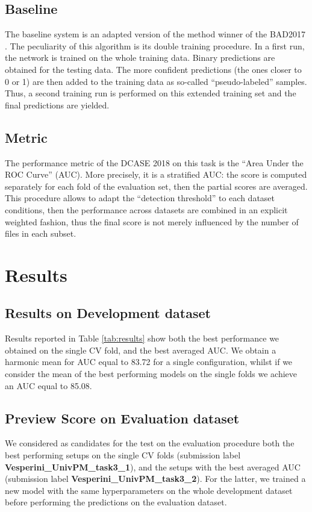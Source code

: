 \subsection{Baseline}
The baseline system is an adapted version of the method winner of the BAD2017 \cite{grill2017two}. The peculiarity of this algorithm is its double training procedure. In a first run, the network is trained on the whole training data. Binary predictions are obtained for the testing data. The more confident predictions (the ones closer to 0 or 1) are then added to the training data as so-called ``pseudo-labeled'' samples. Thus, a second training run is performed on this extended training set and the final predictions are yielded.



\subsection{Metric}
The performance metric of the DCASE 2018 on this task is the ``Area Under the ROC Curve'' (AUC). More precisely, it is a stratified AUC: the score is computed separately for each fold of the evaluation set, then the partial scores are averaged. This procedure allows to adapt the ``detection threshold'' to each dataset conditions, then the performance across datasets are combined in an explicit weighted fashion, thus the final score is not merely influenced by the number of files in each subset.


\section{Results}
\label{sec:results}
\subsection{Results on Development dataset}
Results reported in Table \ref{tab:results} show both the best performance we obtained on the single CV fold, and the best averaged AUC. We obtain a harmonic mean for AUC equal to 83.72 for a single configuration, whilst if we consider the mean of the best performing models on the single folds we achieve an AUC equal to 85.08.

\subsection{Preview Score on Evaluation dataset}
We considered as candidates for the test on the evaluation procedure \cite{dcase2018web} both the best performing setups on the single CV folds (submission label \textbf{Vesperini\_UnivPM\_task3\_1}), and the setups with the best averaged AUC (submission label \textbf{Vesperini\_UnivPM\_task3\_2}). For the latter, we trained a new model with the same hyperparameters on the whole development dataset before performing the predictions on the evaluation dataset.


